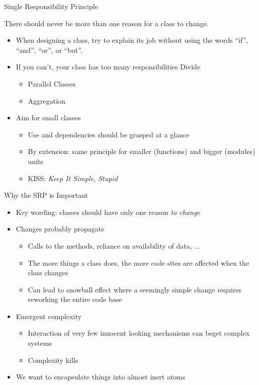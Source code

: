 
\begin{frame}{Single Responsibility Principle}
%
\begin{defbox}[Definition]
There should never be more than one reason for a class to change.
\end{defbox}
%
\begin{itemize}
\item When designing a class, try to explain its job without using the words \enquote{if}, \enquote{and}, \enquote{or}, or \enquote{but}.
\item If you can't, your class has too many responsibilities \Thus Divide
	\begin{itemize}
	\item Parallel Classes
	\item Aggregation
	\end{itemize}
\item Aim for small classes
	\begin{itemize}
	\item Use and dependencies should be grasped at a glance
	\item By extension: same principle for smaller (functions) and bigger (modules) units
	\item KISS: \emph{Keep It Simple, Stupid}
	\end{itemize}
\end{itemize}
%
\end{frame}


\begin{frame}{Why the SRP is Important}
%
\begin{itemize}
\item Key wording: classes should have only one reason \emph{to change}
\item Changes probably propagate
	\begin{itemize}
	\item Calls to the methods, reliance on availability of data, ...
	\item The more things a class does, the more code sites are affected when the class changes
	\item Can lead to snowball effect where a seemingly simple change requires reworking the entire code base
	\end{itemize}
\item Emergent complexity
	\begin{itemize}
	\item Interaction of very few innocent looking mechanisms can beget complex systems
	\item Complexity kills
	\end{itemize}
\item[\Thus] We want to encapsulate things into almost inert atoms
\end{itemize}
%
\end{frame}

